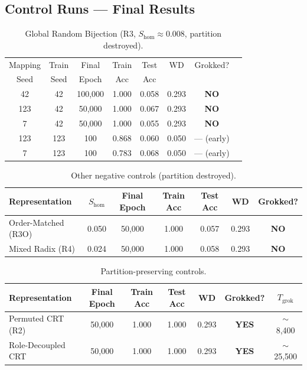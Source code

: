 \documentclass[11pt,a4paper]{article}
\newcommand{\Shom}{S_{\mathrm{hom}}}
\begin{document}
\subsection{Control Runs --- Final Results}

\begin{table}[h]
\centering
\caption{Global Random Bijection (R3, $\Shom \approx 0.008$, partition destroyed).}
\begin{tabular}{cccccccc}
\toprule
Mapping & Train & Final & Train & Test & WD & Grokked? & \\
Seed & Seed & Epoch & Acc & Acc & & & \\
\midrule
42 & 42 & 100,000 & 1.000 & 0.058 & 0.293 & \textbf{NO} & \\
123 & 42 & 50,000 & 1.000 & 0.067 & 0.293 & \textbf{NO} & \\
7 & 42 & 50,000 & 1.000 & 0.055 & 0.293 & \textbf{NO} & \\
123 & 123 & 100 & 0.868 & 0.060 & 0.050 & --- (early) & \\
7 & 123 & 100 & 0.783 & 0.068 & 0.050 & --- (early) & \\
\bottomrule
\end{tabular}
\end{table}

\begin{table}[h]
\centering
\caption{Other negative controls (partition destroyed).}
\begin{tabular}{lcccccc}
\toprule
Representation & $\Shom$ & Final Epoch & Train Acc & Test Acc & WD & Grokked? \\
\midrule
Order-Matched (R3O) & 0.050 & 50,000 & 1.000 & 0.057 & 0.293 & \textbf{NO} \\
Mixed Radix (R4) & 0.024 & 50,000 & 1.000 & 0.058 & 0.293 & \textbf{NO} \\
\bottomrule
\end{tabular}
\end{table}

\begin{table}[h]
\centering
\caption{Partition-preserving controls.}
\begin{tabular}{lcccccc}
\toprule
Representation & Final Epoch & Train Acc & Test Acc & WD & Grokked? & $T_{\mathrm{grok}}$ \\
\midrule
Permuted CRT (R2) & 50,000 & 1.000 & 1.000 & 0.293 & \textbf{YES} & $\sim$8,400 \\
Role-Decoupled CRT & 50,000 & 1.000 & 1.000 & 0.293 & \textbf{YES} & $\sim$25,500 \\
\bottomrule
\end{tabular}
\end{table}
\end{document}
